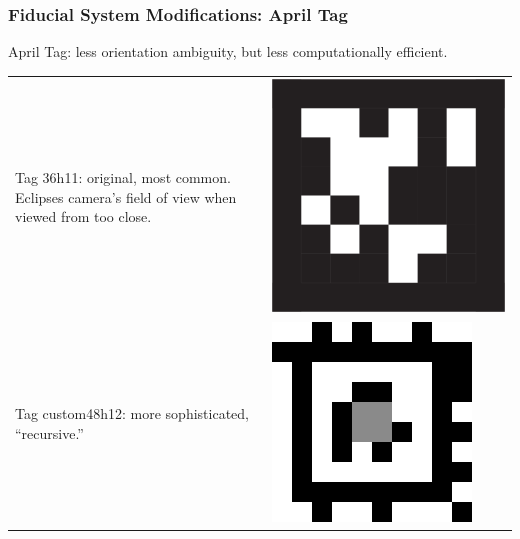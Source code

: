 \documentclass[aspectratio=169]{rubeamer}
\begin{document}
\begin{frame}
  \frametitle{Fiducial System Modifications: April Tag}
  April Tag: less orientation ambiguity, but less computationally efficient.\\
  \centering
  \vspace{1cm}
  \begin{tabular}{m{}m{}}
    Tag 36h11: original, most common. Eclipses camera's field of view when viewed from too close. & \includegraphics[width=\linewidth]{tag_36h11_borderless}\\
    Tag custom48h12: more sophisticated, ``recursive.'' & \includegraphics[width=\linewidth]{tag48_12_00000}
  \end{tabular}
\end{frame}
\end{document}
